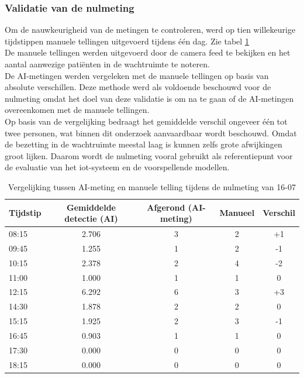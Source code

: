 \subsubsection{Validatie van de nulmeting}
Om de nauwkeurigheid van de metingen te controleren, werd op tien willekeurige tijdstippen manuele tellingen uitgevoerd tijdens één dag. Zie tabel \ref{tab:validatie_ai_manueel} \\

De manuele tellingen werden uitgevoerd door de camera feed te bekijken en het aantal aanwezige patiënten in de wachtruimte te noteren. \\   

De AI-metingen werden vergeleken met de manuele tellingen op basis van absolute verschillen. Deze methode werd als voldoende beschouwd voor de nulmeting omdat het doel van deze validatie is om na te gaan of de AI-metingen overeenkomen met de manuele tellingen. \\

Op basis van de vergelijking bedraagt het gemiddelde verschil ongeveer één tot twee personen, wat binnen dit onderzoek aanvaardbaar wordt beschouwd. Omdat de bezetting in de wachtruimte meestal laag is kunnen zelfs grote afwijkingen groot lijken. Daarom wordt de nulmeting vooral gebruikt als referentiepunt voor de evaluatie van het \gls{iot}-systeem en de voorspellende modellen. 

\begin{table}[H]
    \caption{Vergelijking tussen AI-meting en manuele telling tijdens de nulmeting van 16-07}
    \label{tab:validatie_ai_manueel}
    \centering
    \begin{tabular}{@{}lcccc@{}}
        \toprule
        \textbf{Tijdstip} & \textbf{Gemiddelde detectie (AI)} & \textbf{Afgerond (AI-meting)} & \textbf{Manueel} & \textbf{Verschil} \\
        \midrule
        08:15 & 2.706 & 3 & 2 & +1 \\
        09:45 & 1.255 & 1 & 2 & -1 \\
        10:15 & 2.378 & 2 & 4 & -2 \\
        11:00 & 1.000 & 1 & 1 & 0 \\
        12:15 & 6.292 & 6 & 3 & +3 \\
        14:30 & 1.878 & 2 & 2 & 0 \\
        15:15 & 1.925 & 2 & 3 & -1 \\
        16:45 & 0.903 & 1 & 1 & 0 \\
        17:30 & 0.000 & 0 & 0 & 0 \\
        18:15 & 0.000 & 0 & 0 & 0 \\
        \bottomrule
    \end{tabular}
\end{table}

